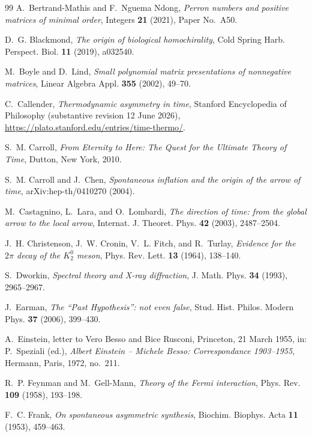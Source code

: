 \documentclass[11pt]{amsart}
\theoremstyle{plain}
\theoremstyle{definition}
\theoremstyle{remark}
\begin{document}
\begin{thebibliography}{99}
A.~Bertrand-Mathis and F.~Nguema Ndong,
\emph{Perron numbers and positive matrices of minimal order},
Integers \textbf{21} (2021), Paper No.~A50.

D.~G. Blackmond,
\emph{The origin of biological homochirality},
Cold Spring Harb. Perspect. Biol. \textbf{11} (2019), a032540.

M.~Boyle and D.~Lind,
\emph{Small polynomial matrix presentations of nonnegative matrices},
Linear Algebra Appl. \textbf{355} (2002), 49--70.

C.~Callender,
\emph{Thermodynamic asymmetry in time},
Stanford Encyclopedia of Philosophy (substantive revision 12 June 2026),
\url{https://plato.stanford.edu/entries/time-thermo/}.

S.~M. Carroll,
\emph{From Eternity to Here: The Quest for the Ultimate Theory of Time},
Dutton, New York, 2010.

S.~M. Carroll and J.~Chen,
\emph{Spontaneous inflation and the origin of the arrow of time},
arXiv:hep-th/0410270 (2004).

M.~Castagnino, L.~Lara, and O.~Lombardi,
\emph{The direction of time: from the global arrow to the local arrow},
Internat. J. Theoret. Phys. \textbf{42} (2003), 2487--2504.

J.~H. Christenson, J.~W. Cronin, V.~L. Fitch, and R.~Turlay,
\emph{Evidence for the $2\pi$ decay of the $K_2^0$ meson},
Phys. Rev. Lett. \textbf{13} (1964), 138--140.

S.~Dworkin,
\emph{Spectral theory and X-ray diffraction},
J. Math. Phys. \textbf{34} (1993), 2965--2967.

J.~Earman,
\emph{The ``Past Hypothesis'': not even false},
Stud. Hist. Philos. Modern Phys. \textbf{37} (2006), 399--430.

A.~Einstein, letter to Vero Besso and Bice Rusconi, Princeton, 21 March 1955,
in: P.~Speziali (ed.), \emph{Albert Einstein -- Michele Besso: Correspondance 1903--1955},
Hermann, Paris, 1972, no.~211.

R.~P. Feynman and M.~Gell-Mann,
\emph{Theory of the Fermi interaction},
Phys. Rev. \textbf{109} (1958), 193--198.

F.~C. Frank,
\emph{On spontaneous asymmetric synthesis},
Biochim. Biophys. Acta \textbf{11} (1953), 459--463.


\end{thebibliography}
\end{document}
